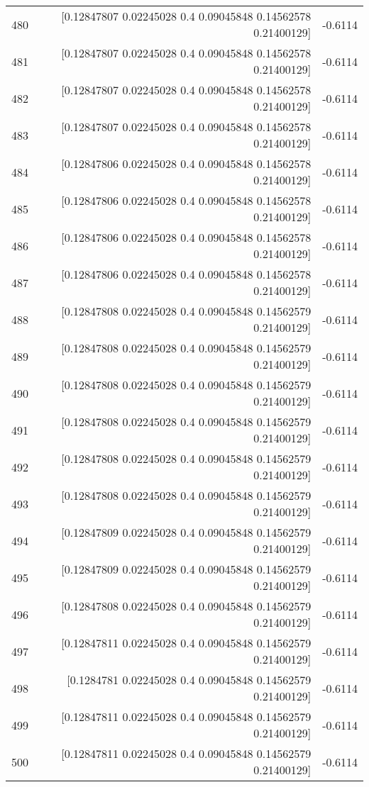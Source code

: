 \begin{longtable}{lrr}
480 & [0.12847807 0.02245028 0.4        0.09045848 0.14562578 0.21400129] & -0.6114 \\
481 & [0.12847807 0.02245028 0.4        0.09045848 0.14562578 0.21400129] & -0.6114 \\
482 & [0.12847807 0.02245028 0.4        0.09045848 0.14562578 0.21400129] & -0.6114 \\
483 & [0.12847807 0.02245028 0.4        0.09045848 0.14562578 0.21400129] & -0.6114 \\
484 & [0.12847806 0.02245028 0.4        0.09045848 0.14562578 0.21400129] & -0.6114 \\
485 & [0.12847806 0.02245028 0.4        0.09045848 0.14562578 0.21400129] & -0.6114 \\
486 & [0.12847806 0.02245028 0.4        0.09045848 0.14562578 0.21400129] & -0.6114 \\
487 & [0.12847806 0.02245028 0.4        0.09045848 0.14562578 0.21400129] & -0.6114 \\
488 & [0.12847808 0.02245028 0.4        0.09045848 0.14562579 0.21400129] & -0.6114 \\
489 & [0.12847808 0.02245028 0.4        0.09045848 0.14562579 0.21400129] & -0.6114 \\
490 & [0.12847808 0.02245028 0.4        0.09045848 0.14562579 0.21400129] & -0.6114 \\
491 & [0.12847808 0.02245028 0.4        0.09045848 0.14562579 0.21400129] & -0.6114 \\
492 & [0.12847808 0.02245028 0.4        0.09045848 0.14562579 0.21400129] & -0.6114 \\
493 & [0.12847808 0.02245028 0.4        0.09045848 0.14562579 0.21400129] & -0.6114 \\
494 & [0.12847809 0.02245028 0.4        0.09045848 0.14562579 0.21400129] & -0.6114 \\
495 & [0.12847809 0.02245028 0.4        0.09045848 0.14562579 0.21400129] & -0.6114 \\
496 & [0.12847808 0.02245028 0.4        0.09045848 0.14562579 0.21400129] & -0.6114 \\
497 & [0.12847811 0.02245028 0.4        0.09045848 0.14562579 0.21400129] & -0.6114 \\
498 & [0.1284781  0.02245028 0.4        0.09045848 0.14562579 0.21400129] & -0.6114 \\
499 & [0.12847811 0.02245028 0.4        0.09045848 0.14562579 0.21400129] & -0.6114 \\
500 & [0.12847811 0.02245028 0.4        0.09045848 0.14562579 0.21400129] & -0.6114 \\
\end{longtable}